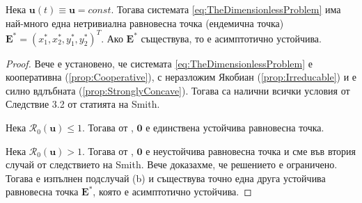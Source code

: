 \begin{proposition}
  Нека $\mathbf{u}(t)\equiv \mathbf{u}=const$.
  Тогава системата \eqref{eq:TheDimensionlessProblem} има най-много една нетривиална равновесна точка (ендемична точка) $\mathbf{E}^*=(x_1^*, x_2^*, y_1^*, y_2^*)^T$.
  Ако $\mathbf{E}^*$ съществува, то е асимптотично устойчива.
\end{proposition}

\begin{proof}
  Вече е установено, че системата \eqref{eq:TheDimensionlessProblem} е кооперативна (\eqref{prop:Cooperative}), с неразложим Якобиан (\eqref{prop:Irreducable}) и е силно вдлъбната (\eqref{prop:StronglyConcave}). Тогава са налични всички условия от Следствие 3.2 от статията \cite{Smith1986} на Smith.

  Нека $\mathscr{R}_0(\mathbf{u}) \leq 1$. Тогава от \cite{Driessche2002}, $\mathbf{0}$ е единствена устойчива равновесна точка.

  Нека $\mathscr{R}_0(\mathbf{u}) > 1$. Тогава от \cite{Driessche2002}, $\mathbf{0}$ е неустойчива равновесна точка и сме във втория случай от следствието на Smith. Вече доказахме, че решението е ограничено. Тогава е изпълнен подслучай (b) и съществува точно една друга устойчива равновесна точка $\mathbf{E}^*$, която е асимптотично устойчива.
\end{proof}

